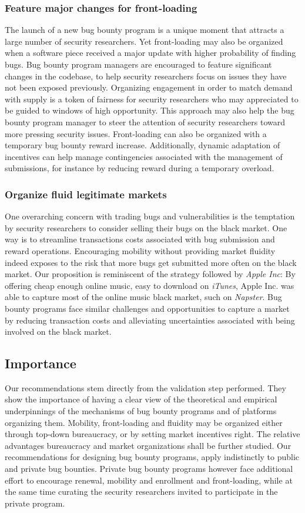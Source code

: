 \subsubsection{Feature major changes for front-loading}
The launch of a new bug bounty program is a unique moment that attracts a large number of security researchers. Yet front-loading may also be organized when a software piece received a major update with higher probability of finding bugs. Bug bounty program managers are encouraged to feature significant changes in the codebase, to help security researchers focus on issues they have not been exposed previously. Organizing engagement in order to match demand with supply is a token of fairness for security researchers who may appreciated to be guided to windows of high opportunity. This approach may also help the bug bounty program manager to steer the attention of security researchers toward more pressing security issues. Front-loading can also be organized with a temporary bug bounty reward increase. Additionally, dynamic adaptation of incentives can help manage contingencies associated with the management of submissions, for instance by reducing reward during a temporary overload. 
 
\subsubsection{Organize fluid legitimate markets}
One overarching concern with trading bugs and vulnerabilities is the temptation by security researchers to consider selling their bugs on the black market. One way is to streamline transactions costs associated with bug submission and reward operations. Encouraging mobility without providing market fluidity indeed exposes to the risk that more bugs get submitted more often on the black market. Our proposition is reminiscent of the strategy followed by {\it Apple Inc}: By offering cheap enough online music, easy to download on {\it iTunes}, Apple Inc. was able to capture most of the online music black market, such on {\it Napster}. Bug bounty programs face similar challenges and opportunities to capture a market by reducing transaction costs and alleviating uncertainties associated with being involved on the black market.

\subsection{Importance}
Our recommendations stem directly from the validation step performed. They show the importance of having a clear view of the theoretical and empirical underpinnings of the mechanisms of bug bounty programs and of platforms organizing them. Mobility, front-loading and fluidity may be organized either through top-down bureaucracy, or by setting market incentives right. The relative advantages bureaucracy and market organizations shall be further studied. Our recommendations for designing bug bounty programs, apply indistinctly to public and private bug bounties. Private bug bounty programs however face additional effort to encourage renewal, mobility and enrollment and front-loading, while at the same time curating the security researchers invited to participate in the private program. 


